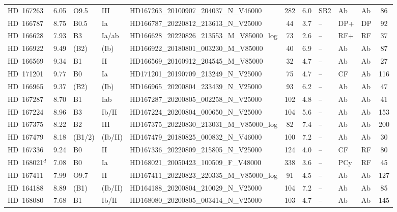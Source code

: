 {\begin{landscape}
\begin{longtable}{lclllcclllc}
\noalign{\smallskip}
HD~167263 & 6.05 & O9.5 & III & HD167263\_20100907\_204037\_N\_V46000 & 282 & 6.0 & SB2 & Ab & Ab & 86 \\
\noalign{\smallskip}
HD~166787 & 8.75 & B0.5 & Ia & HD166787\_20220812\_213613\_N\_V25000 & 44 & 3.7 & -- & DP+ & DP & 92 \\
\noalign{\smallskip}
HD~166628 & 7.93 & B3 & Ia/ab & HD166628\_20220826\_213553\_M\_V85000\_log & 73 & 2.6 & -- & RF+ & RF & 37 \\
\noalign{\smallskip}
HD~166922 & 9.49 & (B2) & (Ib) & HD166922\_20180801\_003230\_M\_V85000 & 40 & 6.9 & -- & Ab & Ab & 87 \\
\noalign{\smallskip}
HD~166569 & 9.34 & B1 & II & HD166569\_20160912\_204545\_M\_V85000 & 32 & 4.7 & -- & Ab & Ab & 27 \\
\noalign{\smallskip}
HD~171201 & 9.77 & B0 & Ia & HD171201\_20190709\_213249\_N\_V25000 & 75 & 4.7 & -- & CF & Ab & 116 \\
\noalign{\smallskip}
HD~166965 & 9.37 & (B2) & (Ib) & HD166965\_20200804\_233439\_N\_V25000 & 93 & 6.2 & -- & Ab & Ab & 47 \\
\noalign{\smallskip}
HD~167287 & 8.70 & B1 & Iab & HD167287\_20200805\_002258\_N\_V25000 & 102 & 4.8 & -- & Ab & Ab & 41 \\
\noalign{\smallskip}
HD~167224 & 8.96 & B3 & Ib/II & HD167224\_20200804\_000650\_N\_V25000 & 104 & 5.6 & -- & Ab & Ab & 153 \\
\noalign{\smallskip}
HD~167375 & 8.22 & B2 & III & HD167375\_20220830\_213031\_M\_V85000\_log & 82 & 7.4 & -- & Ab & Ab & 200 \\
\noalign{\smallskip}
HD~167479 & 8.18 & (B1/2) & (Ib/II) & HD167479\_20180825\_000832\_N\_V46000 & 100 & 7.2 & -- & Ab & Ab & 30 \\
\noalign{\smallskip}
HD~167336 & 9.24 & B0 & II & HD167336\_20220809\_215805\_N\_V25000 & 124 & 4.0 & -- & CF & RF & 80 \\
\noalign{\smallskip}
HD~168021$^{d}$ & 7.08 & B0 & Ia & HD168021\_20050423\_100509\_F\_V48000 & 338 & 3.6 & -- & PCy & RF & 45 \\
\noalign{\smallskip}
HD~167411 & 7.99 & O9.7 & II & HD167411\_20220823\_220335\_M\_V85000\_log & 91 & 4.5 & -- & Ab & Ab & 127 \\
\noalign{\smallskip}
HD~164188 & 8.89 & (B1) & (Ib/II) & HD164188\_20200804\_210029\_N\_V25000 & 104 & 7.2 & -- & Ab & Ab & 85 \\
\noalign{\smallskip}
HD~168080 & 7.68 & B1 & Ib/II & HD168080\_20200805\_003414\_N\_V25000 & 103 & 4.7 & -- & Ab & Ab & 145 \\

\end{longtable}
\end{landscape}}
